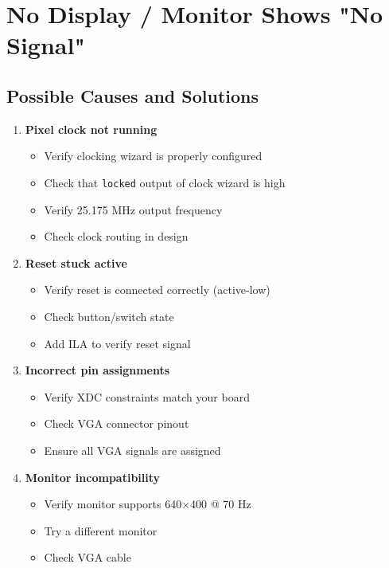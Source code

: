 \documentclass[11pt,letterpaper]{report}
\begin{document}
\section{No Display / Monitor Shows "No Signal"}

\subsection{Possible Causes and Solutions}

\begin{enumerate}
    \item \textbf{Pixel clock not running}
    \begin{itemize}
        \item Verify clocking wizard is properly configured
        \item Check that \texttt{locked} output of clock wizard is high
        \item Verify 25.175 MHz output frequency
        \item Check clock routing in design
    \end{itemize}
    
    \item \textbf{Reset stuck active}
    \begin{itemize}
        \item Verify reset is connected correctly (active-low)
        \item Check button/switch state
        \item Add ILA to verify reset signal
    \end{itemize}
    
    \item \textbf{Incorrect pin assignments}
    \begin{itemize}
        \item Verify XDC constraints match your board
        \item Check VGA connector pinout
        \item Ensure all VGA signals are assigned
    \end{itemize}
    
    \item \textbf{Monitor incompatibility}
    \begin{itemize}
        \item Verify monitor supports 640$\times$400 @ 70 Hz
        \item Try a different monitor
        \item Check VGA cable
    \end{itemize}
\end{enumerate}
\end{document}
